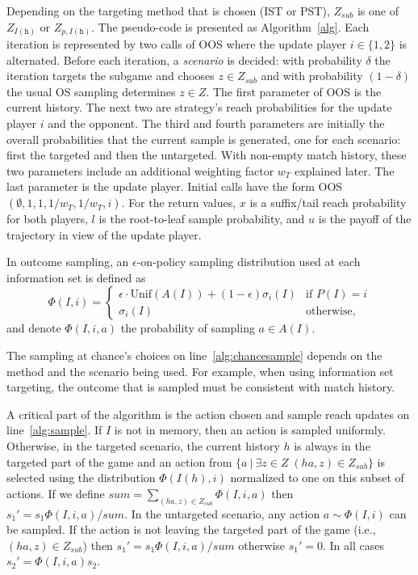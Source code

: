 \documentclass{aamas2015}
\newcommand{\tth}{\mathtt{h}}
\begin{document}
Depending on the targeting method that is chosen (IST or PST), $Z_{sub}$ is one of $Z_{I(\tth)}$ or $Z_{p,I(\tth)}$. 
The pseudo-code is presented as Algorithm~\ref{alg}. 
Each iteration is represented by two calls of OOS where the update player $i \in \{1,2\}$ is alternated. 
Before each iteration, a {\it scenario} is decided: 
with probability $\delta$ the iteration targets the subgame and chooses $z \in Z_{sub}$
and with probability $(1-\delta)$ the usual OS sampling determines $z \in Z$. 
The first parameter of OOS is the current history. 
The next two are strategy's reach probabilities for the update player $i$ and the opponent. 
The third and fourth parameters are initially the overall probabilities that the current sample is generated, one for each scenario: first the targeted and then the untargeted.
With non-empty match history, these two parameters include an additional weighting factor $w_T$ explained later.
The last parameter is the update player. Initial calls have the form OOS$(\emptyset, 1, 1, 1/w_T, 1/w_T, i)$.  
For the return values, $x$ is a suffix/tail reach probability for both players, 
$l$ is the root-to-leaf sample probability, and $u$ is the payoff of the trajectory in view 
of the update player. 

In outcome sampling, an $\epsilon$-on-policy sampling distribution used at each information set
is defined as 
\begin{equation*}
\label{eq:ossample}
\Phi(I,i) = \left\{
\begin{array}{ll}
\epsilon \cdot \mbox{Unif}(A(I)) + (1-\epsilon)\sigma_i(I) & \mbox{if } P(I) = i\\ 
\sigma_i(I)                                          & \mbox{otherwise,}
\end{array} \right.
\end{equation*}
and denote $\Phi(I,i,a)$ the probability of sampling $a \in A(I)$. 

The sampling at chance's choices on line~\ref{alg:chancesample} depends on the method and the scenario being used. For example, when using information set targeting, the outcome that is sampled must be consistent with match history.

A critical part of the algorithm is the action chosen and sample reach updates on line~\ref{alg:sample}. If $I$ is not in memory, then an action is sampled uniformly. Otherwise, in the targeted scenario, the current history $h$ is always in the targeted part of the game and an action from $\{a~|~\exists z\in Z \; (ha,z)\in Z_{sub}\}$ is selected using the distribution $\Phi(I(h),i)$ normalized to one on this subset of actions. If we define $sum=\sum_{(ha,z)\in Z_{sub}}\Phi(I,i,a)$ then $s_1' = s_1\Phi(I,i,a)/sum$. In the untargeted scenario, any action $a \sim \Phi(I,i)$ can be sampled. If the action is not leaving the targeted part of the game (i.e., $(ha,z)\in Z_{sub}$) then $s_1' = s_1\Phi(I,i,a)/sum$ otherwise $s_1'=0$. In all cases $s_2' = \Phi(I,i,a) s_2$.
\end{document}
